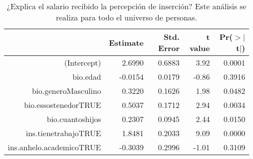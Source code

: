 \begin{table}[ht]
\centering
\begin{tabular}{rrrrr}
  \hline
 & Estimate & Std. Error & t value & Pr($>$$|$t$|$) \\ 
  \hline
(Intercept) & 2.6990 & 0.6883 & 3.92 & 0.0001 \\ 
  bio.edad & -0.0154 & 0.0179 & -0.86 & 0.3916 \\ 
  bio.generoMasculino & 0.3220 & 0.1626 & 1.98 & 0.0482 \\ 
  bio.essostenedorTRUE & 0.5037 & 0.1712 & 2.94 & 0.0034 \\ 
  bio.cuantoshijos & 0.2307 & 0.0945 & 2.44 & 0.0150 \\ 
  ins.tienetrabajoTRUE & 1.8481 & 0.2033 & 9.09 & 0.0000 \\ 
  ins.anhelo.academicoTRUE & -0.3039 & 0.2996 & -1.01 & 0.3109 \\ 
   \hline
\end{tabular}
\caption{¿Explica el salario recibido la percepción de inserción? Este análisis se realiza para todo el universo de personas.} 
\label{tab:reg4}
\end{table}
